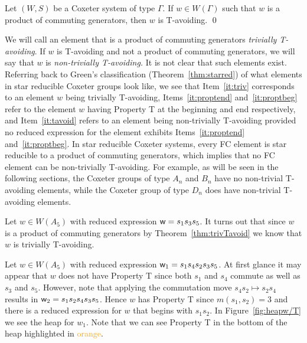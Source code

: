 \begin{theorem}\label{thm:trivTavoid}
Let $(W,S)$ be a Coxeter system of type $\Gamma$. If $w \in W(\Gamma)$ such that $w$ is a product of commuting generators, then $w$ is T-avoiding. \qed	
\end{theorem}

We will call an element that is a product of commuting generators \emph{trivially T-avoiding}. If $w$ is T-avoiding and not a product of commuting generators, we will say that $w$ is \emph{non-trivially T-avoiding.} It is not clear that such elements exist. Referring back to Green's classification (Theorem~\ref{thm:starred}) of what elements in star reducible Coxeter groups look like, we see that Item~\ref{it:triv} corresponds to an element $w$ being trivially T-avoiding, Items~\ref{it:proptend} and~\ref{it:proptbeg} refer to the element $w$ having Property T at the beginning and end respectively, and Item~\ref{it:tavoid} refers to an element being non-trivially T-avoiding provided no reduced expression for the element exhibits Items~\ref{it:proptend} and~\ref{it:proptbeg}. In star reducible Coxeter systems, every FC element is star reducible to a product of commuting generators, which implies that no FC element can be non-trivially T-avoiding. For example, as will be seen in the following sections, the Coxeter groups of type $A_n$ and $B_n$ have no non-trivial T-avoiding elements, while the Coxeter group of type $D_n$ does have non-trivial T-avoiding elements.


\begin{example}\label{ex:tavoid}
Let $w \in W(A_5)$ with reduced expression $\mathsf{w}=s_1s_3s_5$. It turns out that since $w$ is a product of commuting generators by Theorem~\ref{thm:trivTavoid} we know that $w$ is trivially T-avoiding. %
\end{example}
\begin{example}\label{ex:prop-T}
Let $w \in W(A_5)$ with reduced expression $\mathsf{w}_1=s_1s_4s_2s_3s_5$. At first glance it may appear that $w$ does not have Property T since both $s_1$ and $s_4$ commute as well as $s_3$ and $s_5$. However, note that applying the commutation move $s_4s_2 \mapsto s_2s_4$ results in $\mathsf{w}_2=s_1s_2s_4s_3s_5$. Hence $w$ has Property T since $m(s_1,s_2)=3$ and there is a reduced expression for $w$ that begins with $s_1s_2$. In Figure~\ref{fig:heapw/T} we see the heap for $w_1$. Note that we can see Property T in the bottom of the heap highlighted in \textcolor{orange}{orange}.
\end{example}

